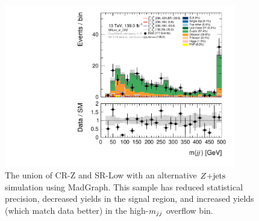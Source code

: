 \begin{figure}[tp]
\centering
\includegraphics[width=0.9\textwidth]{figures/2ljets_low_mjj_SRLow_or_CRZ_mg5.pdf}
\caption[
The union of CR-Z and SR-Low with an alternative $\zjets$ simulation using
MadGraph
]{%
The union of CR-Z and SR-Low with an alternative $\zjets$ simulation using
MadGraph.
This sample has reduced statistical precision, decreased yields in the signal
region, and increased yields (which match data better) in the high-$m_{jj}$
overflow bin.
}
\label{fig:2ljets_low_sr_or_cr_region_alt}
\end{figure}

